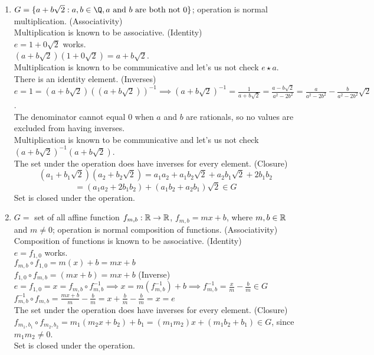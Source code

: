 \documentclass[12pt]{article}
\begin{document}
\begin{enumerate}
		\item $G = \{a + b\sqrt{2} : a,b\in\Q, \text{$a$ and $b$ are both not 0}\}$; operation is normal multiplication.\m
		(Associativity)\\
		Multiplication is known to be associative.\m
		(Identity)\\
		$e = 1 + 0\sqrt{2}$ works.\\
		$(a+b\sqrt{2})(1+0\sqrt{2}) = a+b\sqrt{2}$.\\
		Multiplication is known to be communicative and let's us not check $e \star a$.\\
		There is an identity element.\m
		(Inverses)\\
		$e = 1 = (a+b\sqrt{2})((a+b\sqrt{2}))^{-1} \implies (a+b\sqrt{2})^{-1} = \frac{1}{a+b\sqrt{2}} = \frac{a-b\sqrt{2}}{a^2-2b^2} = \frac{a}{a^2-2b^2} -\frac{b}{a^2-2b^2}\sqrt{2}$.\\
		The denominator cannot equal $0$ when $a$ and $b$ are rationals, so no values are excluded from having inverses.\\
		Multiplication is known to be communicative and let's us not check $(a+b\sqrt{2})^{-1}(a+b\sqrt{2})$.\\
		The set under the operation does have inverses for every element.\m
		(Closure)\\
		\[(a_1+b_1\sqrt{2})(a_2+b_2\sqrt{2}) = a_1a_2+a_1b_2\sqrt{2} +a_2b_1\sqrt{2} + 2b_1b_2\]\[ = (a_1a_2+2b_1b_2) + (a_1b_2+a_2b_1)\sqrt{2}\in G\]
		Set is closed under the operation.\bigskip
		
		\item $G =$ set of all affine function $f_{m,b} : \mathbb{R}\rightarrow\mathbb{R}$, $f_{m,b} = mx+b$, where $m,b\in\mathbb{R}$ and $m\neq0$; operation is normal composition of functions.\m
		(Associativity)\\
		Composition of functions is known to be associative.\m
		(Identity)\\
		$e = f_{1,0}$ works.\\
		$f_{m,b} \circ f_{1,0} = m(x)+b = mx+b$\\
		$f_{1,0} \circ f_{m,b} = (mx+b) = mx+b$\m
		(Inverse)\\
		$e = f_{1,0} = x = f_{m,b} \circ f_{m,b}^{-1} \implies x=m(f_{m,b}^{-1})+b \implies f_{m,b}^{-1} =\frac{x}{m}-\frac{b}{m} \in G$\\
		$f_{m,b}^{-1} \circ f_{m,b} =\frac{mx+b}{m}-\frac{b}{m} = x +\frac{b}{m} - \frac{b}{m} = x = e$\\
		 The set under the operation does have inverses for every element.\m
		(Closure)\\
		$f_{m_1,b_1} \circ f_{m_2,b_2} = m_1(m_2x+b_2)+b_1 = (m_1m_2)x+(m_1b_2+b_1) \in G$, since $m_1m_2\neq0$.\\
		Set is closed under the operation.
	\end{enumerate}
\end{document}
